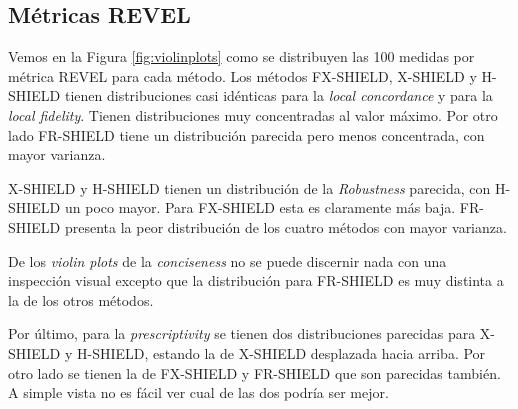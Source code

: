 \subsection{Métricas REVEL}

Vemos en la Figura \ref{fig:violinplots} como se distribuyen las 100 medidas por métrica REVEL para cada método. Los métodos FX-SHIELD, X-SHIELD y H-SHIELD tienen distribuciones casi idénticas para la \textit{local concordance} y para la \textit{local fidelity}. Tienen distribuciones muy concentradas al valor máximo. Por otro lado FR-SHIELD tiene un distribución parecida pero menos concentrada, con mayor varianza. 

X-SHIELD y H-SHIELD tienen un distribución de la \textit{Robustness} parecida, con H-SHIELD un poco mayor. Para FX-SHIELD esta es claramente más baja. FR-SHIELD presenta la peor distribución de los cuatro métodos con mayor varianza.

De los \textit{violin plots} de la \textit{conciseness} no se puede discernir nada con una inspección visual excepto que la distribución para FR-SHIELD es muy distinta a la de los otros métodos.

Por último, para la \textit{prescriptivity} se tienen dos distribuciones parecidas para X-SHIELD y H-SHIELD, estando la de X-SHIELD desplazada hacia arriba. Por otro lado se tienen la de FX-SHIELD y FR-SHIELD que son parecidas también. A simple vista no es fácil ver cual de las dos podría ser mejor.


